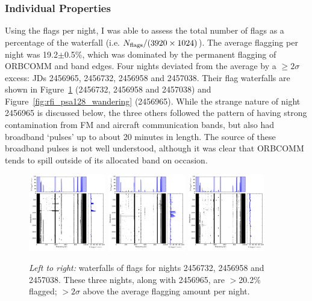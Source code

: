 \subsubsection{Individual Properties}
\label{subsubsec:indivprops}

Using the flags per night, I was able to assess the total number of flags as a percentage of the waterfall (i.e. $N_{\rm flags}/(3920\times1024)$). The average flagging per night was 19.2$\pm$0.5\%, which was dominated by the permanent flagging of ORBCOMM and band edges. Four nights deviated from the average by a $\geq 2\sigma$ excess: JDs 2456965, 2456732, 2456958 and 2457038. Their flag waterfalls are shown in Figure~\ref{fig:rfi_psa128_worst} (2456732, 2456958 and 2457038) and Figure~\ref{fig:rfi_psa128_wandering} (2456965). While the strange nature of night 2456965 is discussed below, the three others followed the pattern of having strong contamination from FM and aircraft communication bands, but also had broadband `pulses' up to about 20 minutes in length. The source of these broadband pulses is not well understood, although it was clear that ORBCOMM tends to spill outside of its allocated band on occasion.

\begin{figure}[h!]
\centering
\includegraphics[width=0.3\textwidth]{chapters/data_processing/figures/2456732RFI.png}
\includegraphics[width=0.3\textwidth]{chapters/data_processing/figures/2456958RFI.png}
\includegraphics[width=0.3\textwidth]{chapters/data_processing/figures/2457038RFI.png}
\caption[Waterfalls of RFI flags for nights 2456732, 2456958 and 2457038.]{\textit{Left to right:} waterfalls of flags for nights 2456732, 2456958 and 2457038. These three nights, along with 2456965, are $>$20.2\% flagged; $>2\sigma$ above the average flagging amount per night.}
\label{fig:rfi_psa128_worst}
\end{figure}



